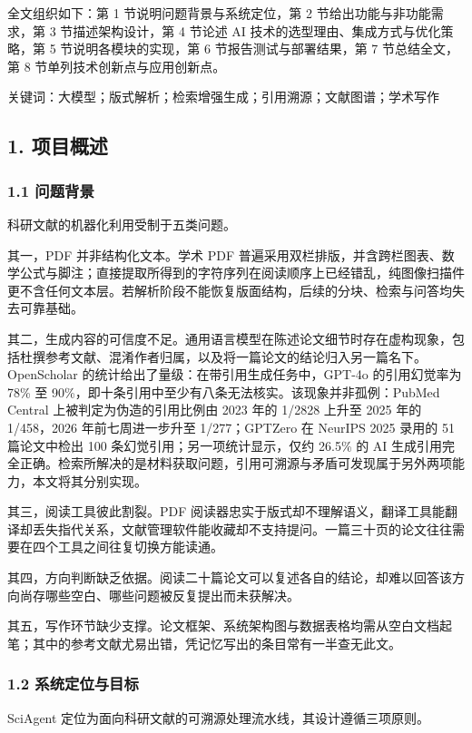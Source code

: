 \documentclass[UTF8,fontset=windows,zihao=5,a4paper]{ctexart}
\begin{document}
全文组织如下：第 1 节说明问题背景与系统定位，第 2 节给出功能与非功能需求，第 3 节描述架构设计，第 4 节论述 AI 技术的选型理由、集成方式与优化策略，第 5 节说明各模块的实现，第 6 节报告测试与部署结果，第 7 节总结全文，第 8 节单列技术创新点与应用创新点。

关键词：大模型；版式解析；检索增强生成；引用溯源；文献图谱；学术写作

\subsection*{1. 项目概述}
\subsubsection*{1.1 问题背景}
科研文献的机器化利用受制于五类问题。

其一，PDF 并非结构化文本。学术 PDF 普遍采用双栏排版，并含跨栏图表、数学公式与脚注；直接提取所得到的字符序列在阅读顺序上已经错乱，纯图像扫描件更不含任何文本层。若解析阶段不能恢复版面结构，后续的分块、检索与问答均失去可靠基础。

其二，生成内容的可信度不足。通用语言模型在陈述论文细节时存在虚构现象，包括杜撰参考文献、混淆作者归属，以及将一篇论文的结论归入另一篇名下。OpenScholar 的统计给出了量级：在带引用生成任务中，GPT-4o 的引用幻觉率为 78\% 至 90\%，即十条引用中至少有八条无法核实。该现象并非孤例：PubMed Central 上被判定为伪造的引用比例由 2023 年的 1/2828 上升至 2025 年的 1/458，2026 年前七周进一步升至 1/277；GPTZero 在 NeurIPS 2025 录用的 51 篇论文中检出 100 条幻觉引用；另一项统计显示，仅约 26.5\% 的 AI 生成引用完全正确。检索所解决的是材料获取问题，引用可溯源与矛盾可发现属于另外两项能力，本文将其分别实现。

其三，阅读工具彼此割裂。PDF 阅读器忠实于版式却不理解语义，翻译工具能翻译却丢失指代关系，文献管理软件能收藏却不支持提问。一篇三十页的论文往往需要在四个工具之间往复切换方能读通。

其四，方向判断缺乏依据。阅读二十篇论文可以复述各自的结论，却难以回答该方向尚存哪些空白、哪些问题被反复提出而未获解决。

其五，写作环节缺少支撑。论文框架、系统架构图与数据表格均需从空白文档起笔；其中的参考文献尤易出错，凭记忆写出的条目常有一半查无此文。

\subsubsection*{1.2 系统定位与目标}
SciAgent 定位为面向科研文献的可溯源处理流水线，其设计遵循三项原则。
\end{document}
